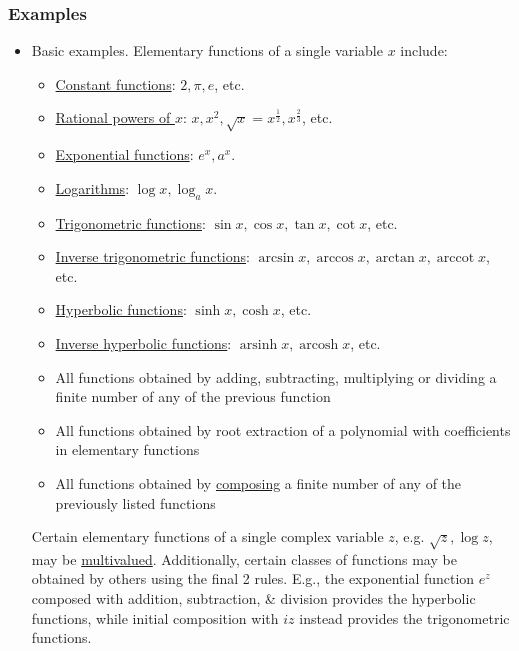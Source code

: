 \documentclass{article}
\begin{document}
\subsubsection{Examples}

\begin{itemize}
	\item {\sf Basic examples.} Elementary functions of a single variable $x$ include:
	\begin{itemize}
		\item \href{https://en.wikipedia.org/wiki/Constant_function}{Constant functions}: $2,\pi,e$, etc.
		\item \href{https://en.wikipedia.org/wiki/Exponentiation#Rational_exponents}{Rational powers of $x$}: $x,x^2,\sqrt{x} = x^{\frac{1}{2}},x^{\frac{2}{3}}$, etc.
		\item \href{https://en.wikipedia.org/wiki/Exponential_function}{Exponential functions}: $e^x,a^x$.
		\item \href{https://en.wikipedia.org/wiki/Logarithm}{Logarithms}: $\log x,\log_ax$.
		\item \href{https://en.wikipedia.org/wiki/Trigonometric_function}{Trigonometric functions}: $\sin x,\cos x,\tan x,\cot x$, etc.
		\item \href{https://en.wikipedia.org/wiki/Inverse_trigonometric_function}{Inverse trigonometric functions}: $\arcsin x,\arccos x,\arctan x,\operatorname{arccot} x$, etc.
		\item \href{https://en.wikipedia.org/wiki/Hyperbolic_function}{Hyperbolic functions}: $\sinh x,\cosh x$, etc.
		\item \href{https://en.wikipedia.org/wiki/Inverse_hyperbolic_function}{Inverse hyperbolic functions}: $\operatorname{arsinh}x,\operatorname{arcosh}x$, etc.
		\item All functions obtained by adding, subtracting, multiplying or dividing a finite number of any of the previous function
		\item All functions obtained by root extraction of a polynomial with coefficients in elementary functions
		\item All functions obtained by \href{https://en.wikipedia.org/wiki/Function_composition}{composing} a finite number of any of the previously listed functions
	\end{itemize}
	Certain elementary functions of a single complex variable $z$, e.g. $\sqrt{z},\log z$, may be \href{https://en.wikipedia.org/wiki/Multivalued_function}{multivalued}. Additionally, certain classes of functions may be obtained by others using the final 2 rules. E.g., the exponential function $e^z$ composed with addition, subtraction, \& division provides the hyperbolic functions, while initial composition with $iz$ instead provides the trigonometric functions.

\end{itemize}
\end{document}
